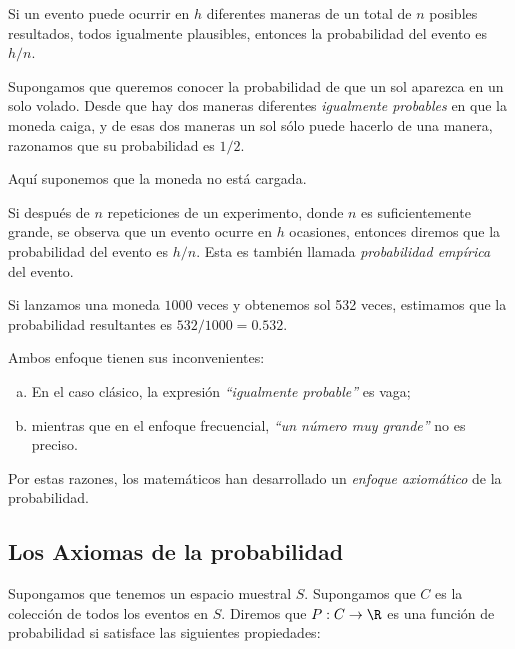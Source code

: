 Si un evento puede ocurrir en $h$ diferentes maneras de un total de $n$ posibles resultados, todos igualmente plausibles, entonces la probabilidad del evento es $h/n.$


 \begin{ejemplo}
  \label{exmp:1.10}
  Supongamos que queremos conocer la probabilidad de que un sol aparezca en un solo volado.  Desde que hay dos maneras diferentes \emph{igualmente probables} en que la moneda caiga,  y de esas dos maneras un sol sólo puede hacerlo de una manera, razonamos que su probabilidad es $1/2.$
    

  \begin{rem}
   Aquí suponemos que la moneda no está cargada.
  \end{rem}

 \end{ejemplo}


Si después de $n$ repeticiones de un experimento, donde $n$ es suficientemente grande, se observa que un evento ocurre en $h$ ocasiones, entonces diremos que la probabilidad del evento es $h/n.$  Esta es también llamada \emph{probabilidad empírica} del evento.


\begin{ejemplo}
 \label{exmp:1.11}
 Si lanzamos una moneda $1000$ veces y obtenemos sol 532 veces, estimamos que la probabilidad resultantes es $532/1000=0.532$.
\end{ejemplo}



 \begin{rem}
  Ambos enfoque tienen sus inconvenientes:
  \begin{enumerate}[(a)]
   \item En el caso clásico, la expresión \emph{``igualmente probable''} es vaga; 
   \item mientras que en el enfoque frecuencial, \emph{``un número muy grande''} no es preciso. 
  \end{enumerate}
Por estas razones, los matemáticos han desarrollado un \emph{enfoque axiomático} de la probabilidad.
 \end{rem}


\subsection{Los Axiomas de la probabilidad}

Supongamos que tenemos un espacio muestral $S.$ Supongamos que $C$ es la colección de todos los eventos en $S.$ Diremos que $P:C \to \R$ es una función de probabilidad si satisface las siguientes propiedades:


